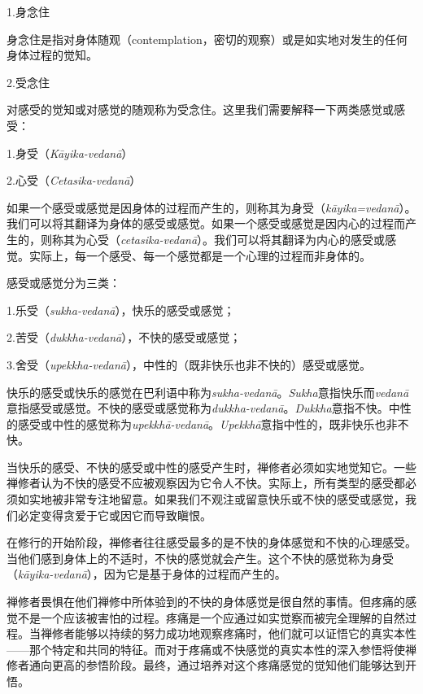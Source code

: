 \sssubsectnon 1.身念住

身念住是指对身体随观（contemplation，密切的观察）或是如实地对发生的任何身体过程的觉知。

\sssubsectnon 2.受念住

对感受的觉知或对感觉的随观称为受念住。这里我们需要解释一下两类感觉或感受：

{
\leftskip=1.6pc
\item{1.}身受（{\it K\=ayika-vedan\=a}）
\item{2.}\1心受（{\it Cetasika-vedan\=a}）

}

如果一个感受或感觉是因身体的过程而产生的，则称其为身受（{\it k\=ayika=vedan\=a}）。我们可以将其翻译为身体的感受或感觉。如果一个感受或感觉是因内心的过程而产生的，则称其为心受（{\it cetasika-vedan\=a}）。我们可以将其翻译为内心的感受或感觉。实际上，每一个感受、每一个感觉都是一个心理的过程而非身体的。

感受或感觉分为三类：

{
\leftskip=1.6pc
\item{1.}乐受（{\it sukha-vedan\=a}），快乐的感受或感觉；
\item{2.}苦受（{\it dukkha-vedan\=a}），不快的感受或感觉；
\item{3.}舍受（{\it upekkha-vedan\=a}），中性的（既非快乐也非不快的）感受或感觉。

}

快乐的感受或快乐的感觉在巴利语中称为{\it sukha-vedan\=a}。{\it Sukha}意指快乐而{\it vedan\=a}意指感受或感觉。不快的感受或感觉称为{\it dukkha-vedan\=a}。{\it Dukkha}意指不快。中性的感受或中性的感觉称为{\it upekkh\=a-vedan\=a}。{\it Upekkh\=a}意指中性的，既非快乐也非不快。

当快乐的感受、不快的感受或中性的感受产生时，禅修者必须如实地觉知它。一些禅修者认为不快的感受不应被观察因为它令人不快。实际上，所有类型的感受都必须如实地被非常专注地留意。如果我们不观注或留意快乐或不快的感受或感觉，我们必定变得贪爱于它或因它而导致瞋恨。

在修行的开始阶段，禅修者往往感受最多的是不快的身体感觉和不快的心理感受。当他们感到身体上的不适时，不快的感觉就会产生。这个\1不快的感觉称为身受（{\it k\=ayika-vedan\=a}），因为它是基于身体的过程而产生的。

禅修者畏惧在他们禅修中所体验到的不快的身体感觉是很自然的事情。但疼痛的感觉不是一个应该被害怕的过程。疼痛是一个应通过如实觉察而被完全理解的自然过程。当禅修者能够以持续的努力成功地观察疼痛时，他们就可以证悟它的真实本性——那个特定和共同的特征。而对于疼痛或不快感觉的真实本性的深入参悟将使禅修者通向更高的参悟阶段。最终，通过培养对这个疼痛感觉的觉知他们能够达到开悟。

